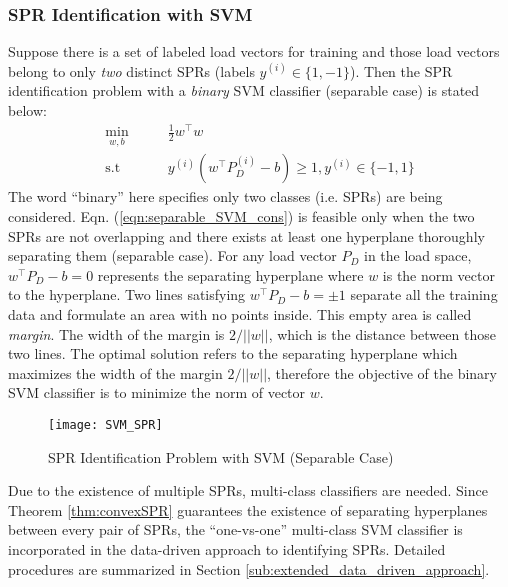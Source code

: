 \documentclass[letterpaper, 11pt]{article}
\theoremstyle{plain}
\theoremstyle{definition}
\begin{document}
\subsubsection{SPR Identification with SVM} \label{ssub:spr_identification_with_svm}
Suppose there is a set of labeled load vectors for training and those load vectors belong to only \emph{two} distinct SPRs (labels $y^{(i)} \in \{1,-1\}$).
Then the SPR identification problem with a \emph{binary} SVM classifier (separable case) is stated below:
\begin{subequations}
\begin{align}
  \min_{w,b} & \qquad \frac{1}{2} w^\intercal  w   \label{eqn:separable_SVM_obj} \\ 
  \text{s.t} & \qquad y^{(i)}(w^\intercal  P_D^{(i)}-b) \ge 1, y^{(i)} \in \{-1,1\} \label{eqn:separable_SVM_cons}	
\end{align}
\end{subequations}
The word ``binary'' here specifies only two classes (i.e. SPRs) are being considered. Eqn. (\ref{eqn:separable_SVM_cons}) is feasible only when the two SPRs are not overlapping and there exists at least one hyperplane thoroughly separating them (separable case). For any load vector $P_D$ in the load space, 
$w^\intercal P_D - b = 0$ represents the separating hyperplane where $w$ is the norm vector to the hyperplane. Two lines satisfying $w^\intercal P_D - b = \pm 1$ separate all the training data and formulate an area with no points inside. This empty area is called \emph{margin}. The width of the margin is $2/||w||$, which is the distance between those two lines. The optimal solution refers to the separating hyperplane which maximizes the width of the margin $2/||w||$, therefore the objective of the binary SVM classifier is to minimize the norm of vector $w$.
\begin{figure}[htbp]
  \centering
  \texttt{[image: SVM\_SPR]}
  \caption{SPR Identification Problem with SVM (Separable Case)}
  \label{fig:SVM_SPR}
\end{figure}






Due to the existence of multiple SPRs, multi-class classifiers are needed. Since Theorem \ref{thm:convexSPR} guarantees the existence of separating hyperplanes between every pair of SPRs, the ``one-vs-one'' multi-class SVM classifier is incorporated in the data-driven approach to identifying SPRs. Detailed procedures are summarized in Section \ref{sub:extended_data_driven_approach}.
\end{document}
